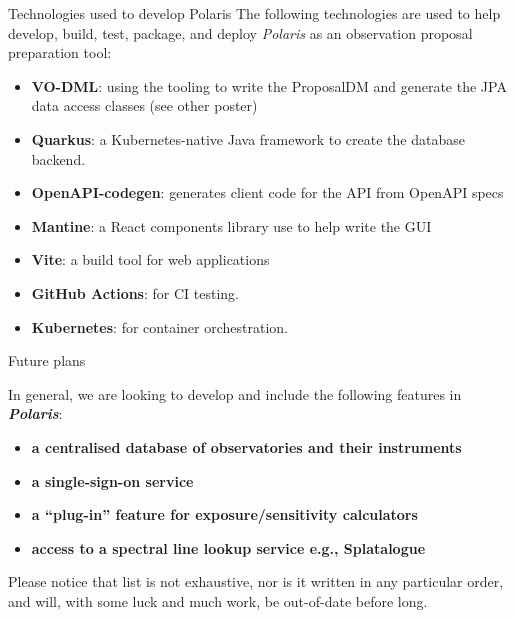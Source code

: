 \documentclass[final]{beamer}
\newlength{\colwidth}
\begin{document}
\begin{frame}[t]
\begin{columns}[t]
\begin{column}{\colwidth}
\begin{block}{Technologies used to develop Polaris}
                    The following technologies are used to help develop, build, test, package, and deploy
                    \emph{Polaris} as an observation proposal preparation tool:

                    \begin{itemize}
                        \item \textbf{VO-DML}: using the tooling to write the ProposalDM and generate the JPA data access classes (see other poster)
                        \item \textbf{Quarkus}: a Kubernetes-native Java framework to create the database backend.
                        \item \textbf{OpenAPI-codegen}: generates client code for the API from OpenAPI specs
                        \item \textbf{Mantine}: a React components library use to help write the GUI
                        \item \textbf{Vite}: a build tool for web applications
                        \item \textbf{GitHub Actions}: for CI testing.
                        \item \textbf{Kubernetes}: for container orchestration.
                    \end{itemize}

                \end{block}

                \begin{exampleblock}{Future plans}

                    In general, we are looking to develop and include the following features in
                    \textbf{\emph{Polaris}}:

                    \begin{itemize}
                        \item \textbf{a centralised database of observatories and their instruments}
                        \item \textbf{a single-sign-on service}
                        \item \textbf{a ``plug-in'' feature for exposure/sensitivity calculators}
                        \item \textbf{access to a spectral line lookup service e.g., Splatalogue}
                    \end{itemize}

                    Please notice that list is not exhaustive, nor is it written in any particular order,
                    and will, with some luck and much work, be out-of-date before long.


\end{exampleblock}
\end{column}
\end{columns}
\end{frame}
\end{document}
